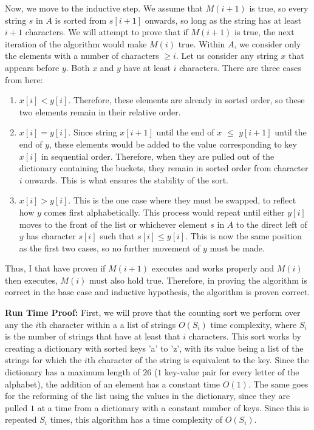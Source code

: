 \documentclass[11pt]{article}
\begin{document}
Now, we move to the inductive step. We assume that $M(i+1)$ is true, so every string $s$ in $A$ is sorted from $s[i+1]$ onwards, 
so long as the string has at least $i+1$ characters. We will attempt to prove that if $M(i+1)$ is true, the next iteration of the algorithm would make 
$M(i)$ true. Within $A$, we consider only the elements with a number of characters $\geq i$. 
Let us consider any string $x$ that appears before $y$. Both $x$ and $y$ have at least $i$ characters. 
There are three cases from here:

\begin{enumerate}[label=(\arabic*), noitemsep]
    \item $x[i] < y[i]$. Therefore, these elements are already in sorted order, so these two elements remain in their relative order.
    \item $x[i] = y[i]$. Since string $x[i+1]$ until the end of $x$ $\leq$ $y[i+1]$ until the end of $y$, these elements would be added to the value corresponding
    to key $x[i]$ in sequential order. Therefore, when they are pulled out of the dictionary containing the buckets, they remain in sorted order from 
    character $i$ onwards. This is what ensures the stability of the sort. 
    \item $x[i] > y[i]$. This is the one case where they must be swapped, to reflect how $y$ comes first alphabetically. This process would repeat 
    until either $y[i]$ moves to the front of the list or whichever element $s$ in $A$ to the direct left of $y$ has character $s[i]$ such that 
    $s[i] \leq y[i]$. This is now the same position as the first two cases, so no further movement of $y$ must be made.
\end{enumerate}

Thus, I that have proven if $M(i+1)$ executes and works properly and $M(i)$ then executes, $M(i)$ must also hold true. 
Therefore, in proving the algorithm is correct in the base case and inductive hypothesis, the algorithm is proven correct.

\textbf{Run Time Proof:} 
First, we will prove that the counting sort we perform over any the $i$th character within a a list of strings $O(S_i)$ time complexity, 
where $S_i$ is the number of strings that have at least that $i$ characters. 
This sort works by creating a dictionary with sorted keys 'a' to 'z', with its value being a list of the strings 
for which the $i$th character of the string is equivalent to the key. 
Since the dictionary has a maximum length of $26$ ($1$ key-value pair for every letter of the alphabet), 
the addition of an element has a constant time $O(1)$. The same goes for the reforming of the list using the values in the dictionary, 
since they are pulled $1$ at a time from a dictionary with a constant number of keys. 
Since this is repeated $S_i$ times, this algorithm has a time complexity of $O(S_i)$. 
\end{document}
